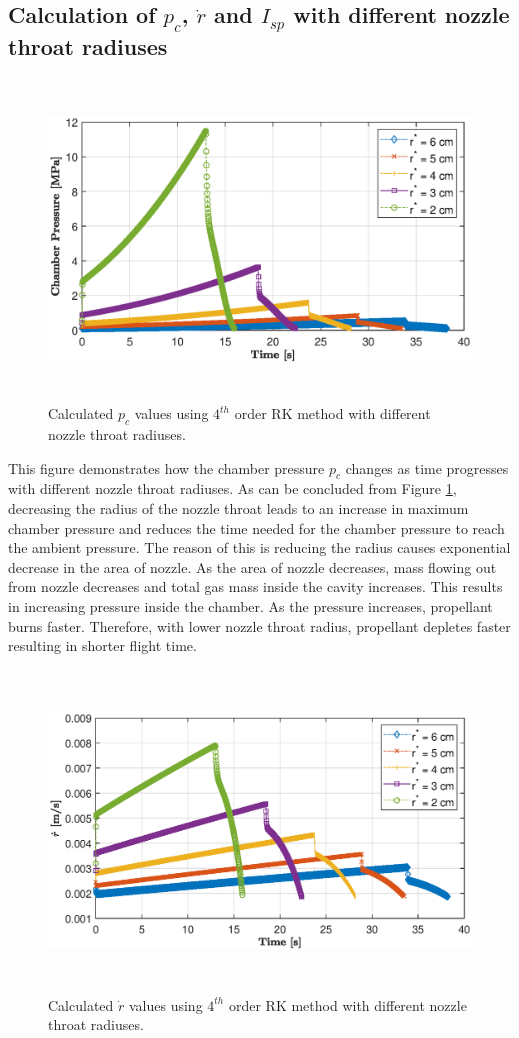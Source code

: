 \documentclass[letterpaper,12pt]{article}
\begin{document}
\subsection{Calculation of $p_c$, $\dot{r}$ and $I_{sp}$ with different nozzle throat radiuses}
\begin{figure}[!h]
	\centering
	\includegraphics[height = 8.5cm]{graphs/q2_pc.eps}
	\caption{Calculated $p_c$ values using $4^{th}$ order RK method with different nozzle throat radiuses.}
	\label{fig:q2p_cp}
\end{figure}

This figure demonstrates how the chamber pressure $p_c$ changes as time progresses with different nozzle throat radiuses.
As can be concluded from Figure \ref{fig:q2p_cp}, decreasing the radius of the nozzle throat leads to an increase in maximum chamber pressure
and reduces the time needed for the chamber pressure to reach the ambient pressure. 
The reason of this is reducing the radius causes exponential decrease in the area of nozzle.
As the area of nozzle decreases, mass flowing out from nozzle decreases and total gas mass inside the cavity increases. 
This results in increasing pressure inside the chamber. As the pressure increases, propellant burns faster. 
Therefore, with lower nozzle throat radius, propellant depletes faster resulting in shorter flight time.

\newpage
\begin{figure}[!h]
	\centering
	\includegraphics[height = 8.5cm]{graphs/q2_rdot.eps}
	\caption{Calculated $\dot{r}$ values using $4^{th}$ order RK method with different nozzle throat radiuses.}
	\label{fig:q2r_dot}
\end{figure}
\end{document}
